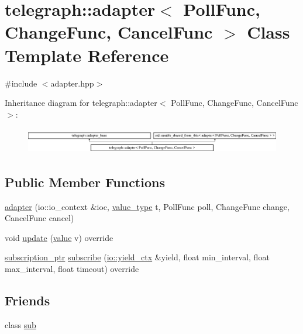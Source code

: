 \hypertarget{classtelegraph_1_1adapter}{}\section{telegraph\+:\+:adapter$<$ Poll\+Func, Change\+Func, Cancel\+Func $>$ Class Template Reference}
\label{classtelegraph_1_1adapter}


{\ttfamily \#include $<$adapter.\+hpp$>$}

Inheritance diagram for telegraph\+:\+:adapter$<$ Poll\+Func, Change\+Func, Cancel\+Func $>$\+:\begin{figure}[H]
\begin{center}
\leavevmode
\includegraphics[height=1.154639cm]{classtelegraph_1_1adapter}
\end{center}
\end{figure}
\subsection*{Public Member Functions}
\begin{DoxyCompactItemize}
\item 
\hyperlink{classtelegraph_1_1adapter_a01578ea2a59c672e85b7c400d4b70817}{adapter} (io\+::io\+\_\+context \&ioc, \hyperlink{classtelegraph_1_1value__type}{value\+\_\+type} t, Poll\+Func poll, Change\+Func change, Cancel\+Func cancel)
\item 
void \hyperlink{classtelegraph_1_1adapter_aabfebfcdec55822a0a5228277205ab47}{update} (\hyperlink{classtelegraph_1_1value}{value} v) override
\item 
\hyperlink{namespacetelegraph_a58641aa5b1a2cbdb0431916a87069f64}{subscription\+\_\+ptr} \hyperlink{classtelegraph_1_1adapter_a0b9c93d0584817ca7dfd74f4ae38ebad}{subscribe} (\hyperlink{structboost_1_1asio_1_1yield__ctx}{io\+::yield\+\_\+ctx} \&yield, float min\+\_\+interval, float max\+\_\+interval, float timeout) override
\end{DoxyCompactItemize}
\subsection*{Friends}
\begin{DoxyCompactItemize}
\item 
class \hyperlink{classtelegraph_1_1adapter_aa1d42a83e16956670795959f328adff4}{sub}
\end{DoxyCompactItemize}


